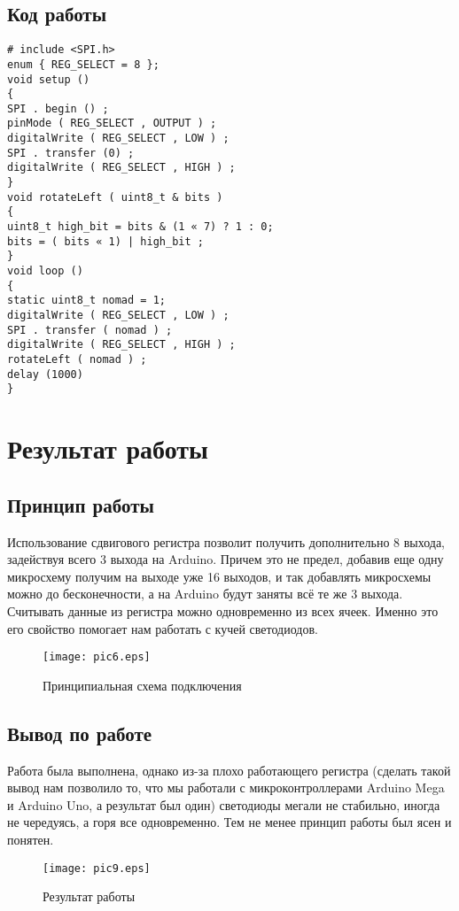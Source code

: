 \documentclass[12pt,a4paper]{scrartcl}
\begin{document}
  \subsection{Код работы}
 \begin{verbatim}
# include <SPI.h> 
enum { REG_SELECT = 8 }; 
void setup () 
{ 
SPI . begin () ; 
pinMode ( REG_SELECT , OUTPUT ) ; 
digitalWrite ( REG_SELECT , LOW ) ; 
SPI . transfer (0) ; 
digitalWrite ( REG_SELECT , HIGH ) ; 
} 
void rotateLeft ( uint8_t & bits ) 
{ 
uint8_t high_bit = bits & (1 « 7) ? 1 : 0; 
bits = ( bits « 1) | high_bit ; 
} 
void loop () 
{ 
static uint8_t nomad = 1; 
digitalWrite ( REG_SELECT , LOW ) ; 
SPI . transfer ( nomad ) ; 
digitalWrite ( REG_SELECT , HIGH ) ; 
rotateLeft ( nomad ) ; 
delay (1000)
}
 \end{verbatim} 
 
\section{Результат работы}

\subsection{Принцип работы}
Использование сдвигового регистра позволит получить дополнительно 8  выхода, задействуя всего 3 выхода на Arduino. Причем это не предел, добавив еще одну микросхему получим на выходе уже 16 выходов, и так добавлять микросхемы можно до бесконечности, а на Arduino будут заняты всё те же 3 выхода. Считывать данные из регистра можно одновременно из всех ячеек. Именно это его свойство помогает нам работать с кучей светодиодов.

  \begin{figure}[h!]  
	\centering
	\texttt{[image: pic6.eps]} %
	\caption{Принципиальная схема подключения} 
	\label{image:pic6}
\end{figure}

\newpage

\subsection{Вывод по работе}
Работа была выполнена, однако из-за плохо работающего регистра (сделать такой вывод нам позволило то, что мы работали с микроконтроллерами Arduino Mega и Arduino Uno, а результат был один) светодиоды мегали не стабильно, иногда не чередуясь, а горя все одновременно. Тем не менее принцип работы был ясен и понятен.

  \begin{figure}[h!]  
	\centering
	\texttt{[image: pic9.eps]} %
	\caption{Результат работы} 
	\label{image:pic9}
\end{figure}
\end{document}
